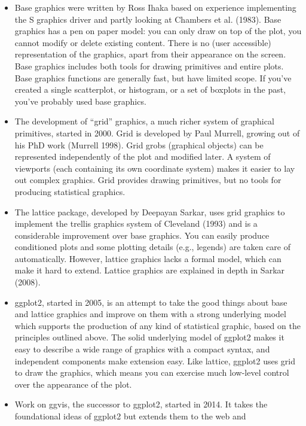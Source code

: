 \begin{itemize}
\item
  Base graphics were written by Ross Ihaka based on experience
  implementing the S graphics driver and partly looking at Chambers et
  al. (1983). Base graphics has a pen on paper model: you can only draw
  on top of the plot, you cannot modify or delete existing content.
  There is no (user accessible) representation of the graphics, apart
  from their appearance on the screen. Base graphics includes both tools
  for drawing primitives and entire plots. Base graphics functions are
  generally fast, but have limited scope. If you've created a single
  scatterplot, or histogram, or a set of boxplots in the past, you've
  probably used base graphics. 
\item
  The development of ``grid'' graphics, a much richer system of
  graphical primitives, started in 2000. Grid is developed by Paul
  Murrell, growing out of his PhD work (Murrell 1998). Grid grobs
  (graphical objects) can be represented independently of the plot and
  modified later. A system of viewports (each containing its own
  coordinate system) makes it easier to lay out complex graphics. Grid
  provides drawing primitives, but no tools for producing statistical
  graphics. 
\item
  The lattice package, developed by Deepayan Sarkar, uses grid graphics
  to implement the trellis graphics system of Cleveland (1993) and is a
  considerable improvement over base graphics. You can easily produce
  conditioned plots and some plotting details (e.g., legends) are taken
  care of automatically. However, lattice graphics lacks a formal model,
  which can make it hard to extend. Lattice graphics are explained in
  depth in Sarkar (2008). 
\item
  ggplot2, started in 2005, is an attempt to take the good things about
  base and lattice graphics and improve on them with a strong underlying
  model which supports the production of any kind of statistical
  graphic, based on the principles outlined above. The solid underlying
  model of ggplot2 makes it easy to describe a wide range of graphics
  with a compact syntax, and independent components make extension easy.
  Like lattice, ggplot2 uses grid to draw the graphics, which means you
  can exercise much low-level control over the appearance of the plot.
\item
  Work on ggvis, the successor to ggplot2, started in 2014. It takes the
  foundational ideas of ggplot2 but extends them to the web and

\end{itemize}
